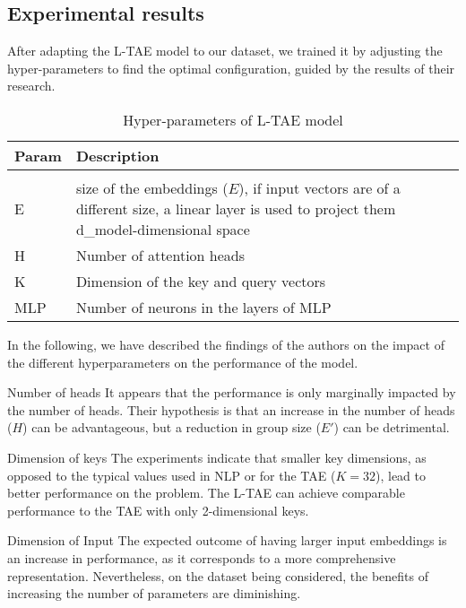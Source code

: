 \subsection{Experimental results}

After adapting the L-TAE model to our dataset, we trained it by adjusting the hyper-parameters to find the optimal configuration, guided by the results of their research.

\begin{table}[ht]
  \centering
  \begin{tabular}{l p{10cm}}   
     Param & Description \\[0.2cm] 
     \hline \\[-0.2cm]  
     E & size of the embeddings ($E$), if input vectors are of a different size, a linear layer is used to project them d\_model-dimensional space \\
     H & Number of attention heads  \\
     K & Dimension of the key and query vectors  \\
     MLP & Number of neurons in the layers of MLP \\
  \end{tabular}
  \caption{Hyper-parameters of L-TAE model}
  \label{tab:LTAEconfig}
\end{table}

In the following, we have described the findings of the authors on the impact of the different hyperparameters on the performance of the model.

\begin{paragraph} {Number of heads} 
It appears that the performance is only marginally impacted by the number of heads. 
Their hypothesis is that an increase in the number of heads ($H$) can be advantageous, but a reduction in group size ($E'$) can be detrimental.
\end{paragraph}

\begin{paragraph} {Dimension of keys}
The experiments indicate that smaller key dimensions, as opposed to the typical values used in NLP or for the TAE ($K = 32$), lead to better performance on the problem.
The L-TAE can achieve comparable performance to the TAE with only 2-dimensional keys.
\end{paragraph}

\begin{paragraph} {Dimension of Input}
The expected outcome of having larger input embeddings is an increase in performance, as it corresponds to a more comprehensive representation.
Nevertheless, on the dataset being considered, the benefits of increasing the number of parameters are diminishing.
\end{paragraph}

